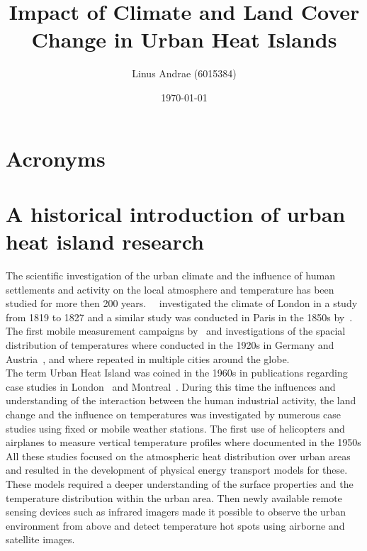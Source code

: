 \documentclass[a4paper, english]{article}
\title{\textbf{\huge Impact of Climate and Land Cover Change in Urban Heat Islands}\\ \vspace{1.2cm} }
\author{Linus Andrae (6015384)}
\date{\today}
\begin{document}
  
  \newpage

  
  \newpage

  \tableofcontents
  \listoffigures
  \listoftables

  \section*{Acronyms}
  \printglossaries%
\newpage

\section{A historical introduction of urban heat island research}
  The scientific investigation of the urban climate and the influence of human settlements and activity on the local atmosphere and temperature has been studied for more then 200 years.%
~\cite{Howard1833}~investigated the climate of London in a study from 1819 to 1827 and a similar study was conducted in Paris in the 1850s by~\cite{renou1862differences}.%
  The first mobile measurement campaigns by~\cite{peppler1929auto} and investigations of the spacial distribution of temperatures where conducted in the 1920s in Germany and Austria~\cite{tollner1932untersuchungen}, and where repeated in multiple cities around the globe.\\%
  The term Urban Heat Island was coined in the 1960s in publications regarding case studies in London~\cite{Chandler1961} and Montreal~\cite{Oke1968}.
  During this time the influences and understanding of the interaction between the human industrial activity, the land change and the influence on temperatures was investigated by numerous case studies using fixed or mobile weather stations.
  The first use of helicopters and airplanes to measure vertical temperature profiles where documented in the 1950s  
  All these studies focused on the atmospheric heat distribution over urban areas and resulted in the development of physical energy transport models for these. 
  These models required a deeper understanding of the surface properties and the temperature distribution within the urban area. 
  Then newly available remote sensing devices such as infrared imagers made it possible to observe the urban environment from above and detect temperature hot spots using airborne and satellite images.  
\end{document}

